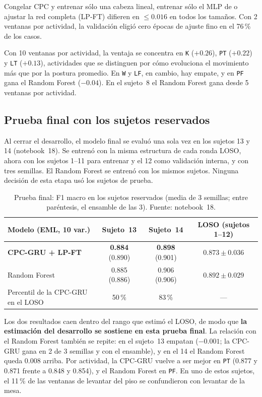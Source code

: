 \documentclass[letterpaper,11pt]{article}
\newcommand{\act}[1]{\texttt{#1}}
\begin{document}
Congelar CPC y entrenar sólo una cabeza lineal, entrenar sólo el MLP de \textcite{haresamudram2021} o ajustar la red completa (LP-FT) difieren en $\le 0.016$ en todos los tamaños. Con 2 ventanas por actividad, la validación eligió cero épocas de ajuste fino en el 76\,\% de los casos.

Con 10 ventanas por actividad, la ventaja se concentra en \act{K} ($+0.26$), \act{PT} ($+0.22$) y \act{LT} ($+0.13$), actividades que se distinguen por cómo evoluciona el movimiento más que por la postura promedio. En \act{W} y \act{LF}, en cambio, hay empate, y en \act{PF} gana el Random Forest ($-0.04$). En el sujeto~8 el Random Forest gana desde 5 ventanas por actividad.

\subsection{Prueba final con los sujetos reservados}
\label{sec:prueba_final}
Al cerrar el desarrollo, el modelo final se evaluó una sola vez en los sujetos 13 y 14 (notebook~18). Se entrenó con la misma estructura de cada ronda LOSO, ahora con los sujetos 1--11 para entrenar y el 12 como validación interna, y con tres semillas. El Random Forest se entrenó con los mismos sujetos. Ninguna decisión de esta etapa usó los sujetos de prueba.

\begin{table}[H]
  \centering
  \small
  \caption{Prueba final: F1 macro en los sujetos reservados (media de 3 semillas; entre paréntesis, el ensamble de las 3). Fuente: notebook~18.}
  \label{tab:prueba_final}
  \begin{tabular}{lccc}
    \toprule
    Modelo (EML, 10 var.) & Sujeto~13 & Sujeto~14 & LOSO (sujetos 1--12) \\
    \midrule
    \textbf{CPC-GRU + LP-FT} & \textbf{0.884} (0.890) & \textbf{0.898} (0.901) & $0.873 \pm 0.036$ \\
    Random Forest & 0.885 (0.886) & 0.906 (0.906) & $0.892 \pm 0.029$ \\
    \midrule
    Percentil de la CPC-GRU en el LOSO & 50\,\% & 83\,\% & --- \\
    \bottomrule
  \end{tabular}
\end{table}

Los dos resultados caen dentro del rango que estimó el LOSO, de modo que \textbf{la estimación del desarrollo se sostiene en esta prueba final}. La relación con el Random Forest también se repite: en el sujeto~13 empatan ($-0.001$; la CPC-GRU gana en 2 de 3 semillas y con el ensamble), y en el 14 el Random Forest queda 0.008 arriba. Por actividad, la CPC-GRU vuelve a ser mejor en \act{PT} (0.877 y 0.871 frente a 0.848 y 0.854), y el Random Forest en \act{PF}. En uno de estos sujetos, el 11\,\% de las ventanas de levantar del piso se confundieron con levantar de la mesa.
\end{document}
